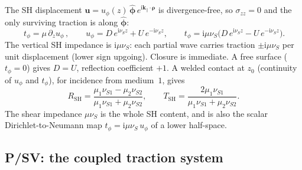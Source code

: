 \documentclass[11pt,a4paper]{article}
\newcommand{\ii}{\mathrm{i}}
\newcommand{\kpar}{\mathbf{k}_{\parallel}}
\newcommand{\brho}{\boldsymbol{\rho}}
\begin{document}
The SH displacement $\mathbf{u}=u_\phi(z)\,\hat{\boldsymbol{\phi}}\,e^{\ii\kpar\cdot\brho}$ is
divergence-free, so $\sigma_{zz}=0$ and the only surviving traction is along
$\hat{\boldsymbol{\phi}}$:
\begin{equation}
\boxed{\,t_\phi=\mu\,\partial_z u_\phi\,},\qquad
u_\phi=D\,e^{\ii\nu_S z}+U\,e^{-\ii\nu_S z},\qquad
t_\phi=\ii\mu\nu_S\big(D\,e^{\ii\nu_S z}-U\,e^{-\ii\nu_S z}\big).
\end{equation}
The vertical SH impedance is $\ii\mu\nu_S$: each partial wave carries traction
$\pm\ii\mu\nu_S$ per unit displacement (lower sign upgoing). Closure is immediate. A free
surface ($t_\phi=0$) gives $D=U$, reflection coefficient $+1$. A welded contact at $z_0$
(continuity of $u_\phi$ and $t_\phi$), for incidence from medium~$1$, gives
\begin{equation}
R_{\mathrm{SH}}=\frac{\mu_1\nu_{S1}-\mu_2\nu_{S2}}{\mu_1\nu_{S1}+\mu_2\nu_{S2}},\qquad
T_{\mathrm{SH}}=\frac{2\mu_1\nu_{S1}}{\mu_1\nu_{S1}+\mu_2\nu_{S2}} .
\end{equation}
The shear impedance $\mu\nu_S$ is the whole SH content, and is also the scalar
Dirichlet-to-Neumann map $t_\phi=\ii\mu\nu_S\,u_\phi$ of a lower half-space.

\subsection{P/SV: the coupled traction system}
\end{document}
